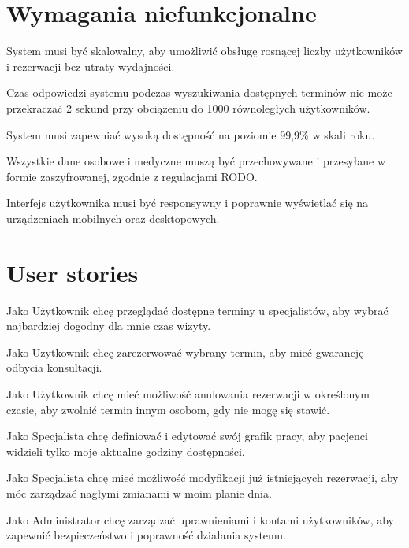 \documentclass[12pt,a4paper]{article}
\begin{document}
\section{Wymagania niefunkcjonalne}
\begin{description}[leftmargin=1.8cm, labelwidth=1.3cm, labelsep=0.5cm]
    \item[NFR1] System musi być skalowalny, aby umożliwić obsługę rosnącej liczby użytkowników i rezerwacji bez utraty wydajności.
    \item[NFR2] Czas odpowiedzi systemu podczas wyszukiwania dostępnych terminów nie może przekraczać 2 sekund przy obciążeniu do 1000 równoległych użytkowników.
    \item[NFR3] System musi zapewniać wysoką dostępność na poziomie 99,9\% w skali roku.
    \item[NFR4] Wszystkie dane osobowe i medyczne muszą być przechowywane i przesyłane w formie zaszyfrowanej, zgodnie z regulacjami RODO.
    \item[NFR5] Interfejs użytkownika musi być responsywny i poprawnie wyświetlać się na urządzeniach mobilnych oraz desktopowych.
\end{description}

\section{User stories}
\begin{description}[leftmargin=1.8cm, labelwidth=1.3cm, labelsep=0.5cm]
    \item[US1] Jako Użytkownik chcę przeglądać dostępne terminy u specjalistów, aby wybrać najbardziej dogodny dla mnie czas wizyty.
    \item[US2] Jako Użytkownik chcę zarezerwować wybrany termin, aby mieć gwarancję odbycia konsultacji.
    \item[US3] Jako Użytkownik chcę mieć możliwość anulowania rezerwacji w określonym czasie, aby zwolnić termin innym osobom, gdy nie mogę się stawić.
    \item[US4] Jako Specjalista chcę definiować i edytować swój grafik pracy, aby pacjenci widzieli tylko moje aktualne godziny dostępności.
    \item[US5] Jako Specjalista chcę mieć możliwość modyfikacji już istniejących rezerwacji, aby móc zarządzać nagłymi zmianami w moim planie dnia.
    \item[US6] Jako Administrator chcę zarządzać uprawnieniami i kontami użytkowników, aby zapewnić bezpieczeństwo i poprawność działania systemu.
\end{description}
\end{document}
